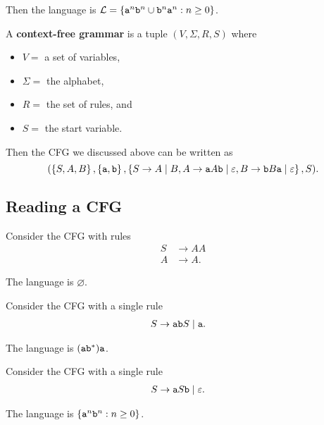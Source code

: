 \documentclass{notes}
\begin{document}
Then the language is $\mathcal L = \left \{ \verb~a~^n \verb~b~^n \cup \verb~b~^n \verb~a~^n : n \geq 0 \right \}$.

\begin{defn}
  A {\boldmath \bfseries context-free grammar} is a tuple $(V, \Sigma, R, S)$ where
  \begin{itemize}
    \item $V = $ a set of variables,  

    \item $\Sigma = $ the alphabet,  

    \item $R = $ the set of rules, and  

    \item $S = $ the start variable.
  \end{itemize}
\end{defn}

Then the CFG we discussed above can be written as 
\[
  (\left \{ S, A, B \right \}, \left \{ \verb~a~, \verb~b~ \right \}, \left \{ S \to A \; | \; B, A \to \verb~a~ A \verb~b~ \; | \; \varepsilon, B \to \verb~b~ B \verb~a~ \; | \; \varepsilon \right \}, S).
\]

\newpage

\subsection{Reading a CFG}

\begin{eg}
  Consider the CFG with rules
  \begin{align*}
    S &\to AA \\ 
    A &\to A.
  \end{align*}
  
  The language is $\varnothing$.
\end{eg}

\begin{eg}
  Consider the CFG with a single rule 
  \begin{align*}
    S &\to \verb~ab~ S \; | \; \verb~a~.
  \end{align*}
  
  The language is $(\verb~ab~^*) \verb~a~$.
\end{eg}

\begin{eg}
  Consider the CFG with a single rule 
  \begin{align*}
    S &\to \verb~a~ S \verb~b~ \; | \; \varepsilon.
  \end{align*}
  
  The language is $\left \{ \verb~a~^n \verb~b~^n : n \geq 0 \right \}$.
\end{eg}
\end{document}
